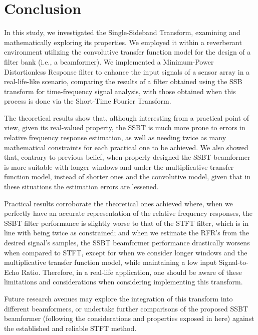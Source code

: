 \section{Conclusion}
\label{sec:conclusion}

In this study, we investigated the Single-Sideband Transform, examining and mathematically exploring its properties. We employed it within a reverberant environment utilizing the convolutive transfer function model for the design of a filter bank (i.e., a beamformer). We implemented a Minimum-Power Distortionless Response filter to enhance the input signals of a sensor array in a real-life-like scenario, comparing the results of a filter obtained using the SSB transform for time-frequency signal analysis, with those obtained when this process is done via the Short-Time Fourier Transform.

The theoretical results show that, although interesting from a practical point of view, given its real-valued property, the SSBT is much more prone to errors in relative frequency response estimation, as well as needing twice as many mathematical constraints for each practical one to be achieved. We also showed that, contrary to previous belief, when properly designed the SSBT beamformer is more suitable with longer windows and under the multiplicative transfer function model, instead of shorter ones and the convolutive model, given that in these situations the estimation errors are lessened.

Practical results corroborate the theoretical ones achieved where, when we perfectly have an accurate representation of the relative frequency responses, the SSBT filter performance is slightly worse to that of the STFT filter, which is in line with being twice as constrained; and when we estimate the RFR's from the desired signal's samples, the SSBT beamformer performance drastically worsens when compared to STFT, except for when we consider longer windows and the multiplicative transfer function model, while maintaining a low input Signal-to-Echo Ratio. Therefore, in a real-life application, one should be aware of these limitations and considerations when considering implementing this transform.

Future research avenues may explore the integration of this transform into different beamformers, or undertake further comparisons of the proposed SSBT beamformer (following the considerations and properties exposed in here) against the established and reliable STFT method.